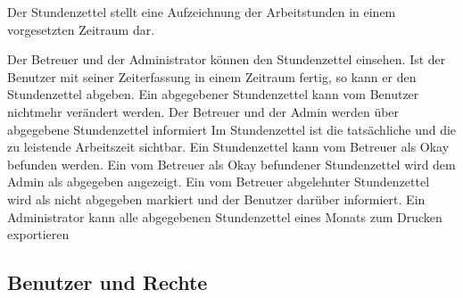 \begin{requirements}
    Der Stundenzettel stellt eine Aufzeichnung der Arbeitstunden in einem vorgesetzten Zeitraum dar.
    \begin{requirements}
         Der Betreuer und der Administrator können den Stundenzettel einsehen.
         Ist der Benutzer mit seiner Zeiterfassung in einem Zeitraum fertig, so kann er den Stundenzettel abgeben.
         Ein abgegebener Stundenzettel kann vom Benutzer nichtmehr verändert werden.
         Der Betreuer und der Admin werden über abgegebene Stundenzettel informiert
         Im Stundenzettel ist die tatsächliche und die zu leistende Arbeitszeit sichtbar.
         Ein Stundenzettel kann vom Betreuer als Okay befunden werden.
         Ein vom Betreuer als Okay befundener Stundenzettel wird dem Admin als abgegeben angezeigt.
         Ein vom Betreuer abgelehnter Stundenzettel wird als nicht abgegeben markiert und der Benutzer darüber informiert.
         Ein Administrator kann alle abgegebenen Stundenzettel eines Monats zum Drucken exportieren
    \end{requirements}

\end{requirements}

\subsection{Benutzer und Rechte}

